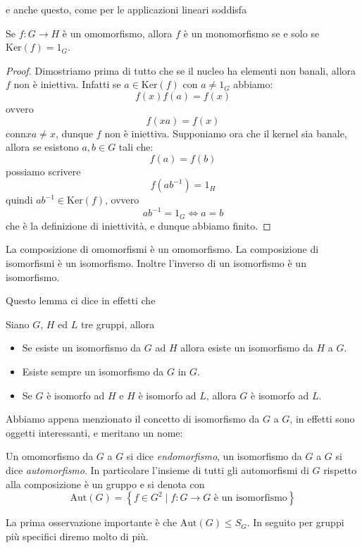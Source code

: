 \documentclass[11pt]{scrartcl}
\renewcommand{\ker}[1]{\text{Ker}\!\left(#1\right)}
\begin{document}
	e anche questo, come per le applicazioni lineari soddisfa
	\begin{lemma}\label{gruppi:monomorfismo=kernel banale}
		Se $f:G\to H$ è un omomorfismo, allora $f$ è un monomorfismo se e solo se $\ker{f}={1_G}$.
	\end{lemma}
	\begin{proof}
		Dimostriamo prima di tutto che se il nucleo ha elementi non banali, allora $f$ non è iniettiva. Infatti se $a\in \ker{f}$ con $a\ne 1_G$ abbiamo:
		$$f(x)f(a)=f(x)$$
		ovvero
		$$f(xa)=f(x)$$
		conn$xa\ne x$, dunque $f$ non è iniettiva. Supponiamo ora che il kernel sia banale, allora se esistono $a,b\in G$ tali che:
		$$f(a)=f(b)$$
		possiamo scrivere
		$$f(ab^{-1})=1_H$$
		quindi $ab^{-1}\in \ker{f}$, ovvero
		$$ab^{-1}=1_G\iff a=b $$
		che è la definizione di iniettività, e dunque abbiamo finito.
	\end{proof}
	
	\begin{lemma}
		La composizione di omomorfismi è un omomorfismo. La composizione di isomorfismi è un isomorfismo. Inoltre l'inverso di un isomorfismo è un isomorfismo.
	\end{lemma}
	Questo lemma ci dice in effetti che 
	\begin{corollary}
		Siano $G$, $H$ ed $L$ tre gruppi, allora
		\begin{itemize}
			\item Se esiste un isomorfismo da $G$ ad $H$ allora esiste un isomorfismo da $H$ a $G$.
			\item Esiste sempre un isomorfismo da $G$ in $G$.
			\item Se $G$ è isomorfo ad $H$ e $H$ è isomorfo ad $L$, allora $G$ è isomorfo ad $L$. 
		\end{itemize}
	\end{corollary}
	Abbiamo appena menzionato il concetto di isomorfismo da $G$ a $G$, in effetti sono oggetti interessanti, e meritano un nome:
	\begin{definition}
		Un omomorfismo da $G$ a $G$ si dice \textit{endomorfismo}, un isomorfismo da $G$ a $G$ si dice \textit{automorfismo}. In particolare l'insieme di tutti gli automorfismi di $G$ rispetto alla composizione è un gruppo e si denota con
		$$\text{Aut}(G)=\left\{f\in G^2\mid f:G\to G \text{ è un isomorfismo}\right\}$$
	\end{definition}
	La prima osservazione importante è che $\text{Aut}(G)\le S_G$. In seguito per gruppi più specifici diremo molto di più. 
	
\end{document}
